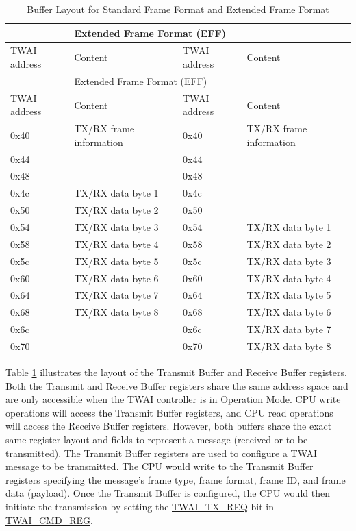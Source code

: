 \documentclass[main\_\_EN.tex]{subfiles}
\begin{document}
\begin{longtable}[c]{|p{2.5cm}|p{4cm}|p{2.5cm}|p{4cm}|}
\caption{Buffer Layout for Standard Frame Format and Extended Frame Format}\label{Figure:TWAI_memory_box}
\\\hline
\rowcolor{lightgray}
\multicolumn{2}{|l|}{Standard Frame Format (SFF)}&\multicolumn{2}{|l|}{Extended Frame Format (EFF)}\\\hline
\rowcolor{gray!25}
TWAI address &Content &TWAI address&Content\\\hline
\endfirsthead
\hline
\rowcolor{lightgray}
\multicolumn{2}{|l|}{Standard Frame Format (SFF)}&\multicolumn{2}{|l|}{Extended Frame Format (EFF)}\\\hline
\rowcolor{gray!25}
TWAI address &Content &TWAI address&Content\\\hline
\endhead
\endfoot
0x40&TX/RX frame information&0x40&TX/RX frame information\\\hline
0x44&\cellcolor{mycyan}{TX/RX identifier 1}&0x44&\cellcolor{mycyan}{TX/RX identifier 1}\\\hline
0x48&\cellcolor{mycyan}{TX/RX identifier 2}&0x48&\cellcolor{mycyan}{TX/RX identifier 2}\\\hline
0x4c&TX/RX data byte 1&0x4c&\cellcolor{mycyan}{TX/RX identifier 3}\\\hline
0x50&TX/RX data byte 2&0x50&\cellcolor{mycyan}{TX/RX identifier 4}\\\hline
0x54&TX/RX data byte 3&0x54&TX/RX data byte 1\\\hline
0x58&TX/RX data byte 4&0x58&TX/RX data byte 2\\\hline
0x5c&TX/RX data byte 5&0x5c&TX/RX data byte 3\\\hline
0x60&TX/RX data byte 6&0x60&TX/RX data byte 4\\\hline
0x64&TX/RX data byte 7&0x64&TX/RX data byte 5\\\hline
0x68&TX/RX data byte 8&0x68&TX/RX data byte 6\\\hline
0x6c&\cellcolor{yellow}{reserved}&0x6c&TX/RX data byte 7\\\hline
0x70&\cellcolor{yellow}{reserved}&0x70&TX/RX data byte 8\\\hline
\end{longtable}

Table \ref{Figure:TWAI_memory_box} illustrates the layout of the Transmit Buffer and Receive Buffer registers. Both the Transmit and Receive Buffer registers share the same address space and are only accessible when the TWAI controller is in Operation Mode. CPU write operations will access the Transmit Buffer registers, and CPU read operations will access the Receive Buffer registers. However, both buffers share the exact same register layout and fields to represent a message (received or to be transmitted).
The Transmit Buffer registers are used to configure a TWAI message to be transmitted. The CPU would write to the Transmit Buffer registers specifying the message’s frame type, frame format, frame ID, and frame data (payload). Once the Transmit Buffer is configured, the CPU would then initiate the transmission by setting the  \hyperref[fielddesc:TWAITXREQ]{TWAI\_TX\_REQ} bit in \hyperref[regdesc:TWAICMDREG]{TWAI\_CMD\_REG}.
\end{document}
